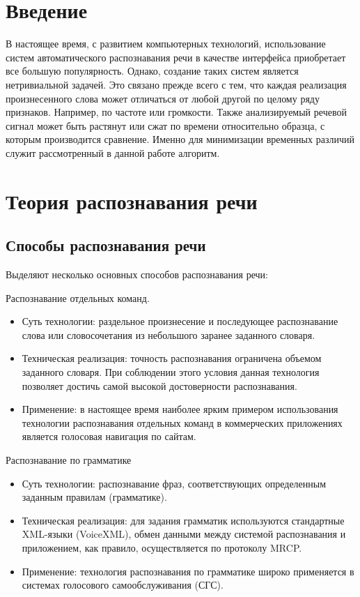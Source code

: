 \documentclass[14pt,russian,utf8,nocolumnsxix]{extarticle}
\begin{document}
\tableofcontents
\pagebreak

\section*{Введение}
В настоящее время, с развитием компьютерных технологий, использование систем автоматического распознавания речи в качестве интерфейса приобретает все большую популярность. Однако, создание таких систем является нетривиальной задачей. Это связано прежде всего с тем, что каждая реализация произнесенного слова может отличаться от любой другой по целому ряду признаков. Например, по частоте или громкости. Также анализируемый речевой сигнал может быть растянут или сжат по времени относительно образца, с которым производится сравнение. Именно для минимизации временных различий служит рассмотренный в данной работе алгоритм.

\pagebreak
\section{Теория распознавания речи}
\subsection{Способы распознавания речи}
Выделяют несколько основных способов распознавания речи:


Распознавание отдельных команд.
\begin{itemize}
\item Суть технологии: раздельное произнесение и последующее распознавание слова или словосочетания из небольшого заранее заданного словаря.

\item Техническая реализация: точность распознавания ограничена объемом заданного словаря. При соблюдении этого условия данная технология позволяет достичь самой высокой достоверности распознавания.

\item Применение: в настоящее время наиболее ярким примером использования технологии распознавания отдельных команд в коммерческих приложениях является голосовая навигация по сайтам.
\end{itemize}

Распознавание по грамматике
\begin{itemize}
\item Суть технологии: распознавание фраз, соответствующих определенным заданным правилам (грамматике).

\item Техническая реализация: для задания грамматик используются стандартные XML-языки (VoiceXML), обмен данными между системой распознавания и приложением, как правило, осуществляется по протоколу MRCP.

\item Применение: технология распознавания по грамматике широко применяется в системах голосового самообслуживания (СГС).
\end{itemize}
\end{document}
